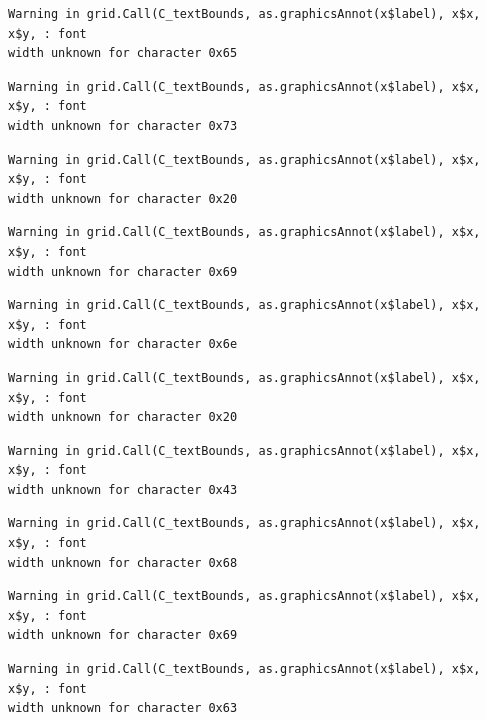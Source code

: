 \documentclass[
  letterpaper,
  DIV=11,
  numbers=noendperiod]{scrreprt}
\begin{document}
\begin{verbatim}
Warning in grid.Call(C_textBounds, as.graphicsAnnot(x$label), x$x, x$y, : font
width unknown for character 0x65
\end{verbatim}

\begin{verbatim}
Warning in grid.Call(C_textBounds, as.graphicsAnnot(x$label), x$x, x$y, : font
width unknown for character 0x73
\end{verbatim}

\begin{verbatim}
Warning in grid.Call(C_textBounds, as.graphicsAnnot(x$label), x$x, x$y, : font
width unknown for character 0x20
\end{verbatim}

\begin{verbatim}
Warning in grid.Call(C_textBounds, as.graphicsAnnot(x$label), x$x, x$y, : font
width unknown for character 0x69
\end{verbatim}

\begin{verbatim}
Warning in grid.Call(C_textBounds, as.graphicsAnnot(x$label), x$x, x$y, : font
width unknown for character 0x6e
\end{verbatim}

\begin{verbatim}
Warning in grid.Call(C_textBounds, as.graphicsAnnot(x$label), x$x, x$y, : font
width unknown for character 0x20
\end{verbatim}

\begin{verbatim}
Warning in grid.Call(C_textBounds, as.graphicsAnnot(x$label), x$x, x$y, : font
width unknown for character 0x43
\end{verbatim}

\begin{verbatim}
Warning in grid.Call(C_textBounds, as.graphicsAnnot(x$label), x$x, x$y, : font
width unknown for character 0x68
\end{verbatim}

\begin{verbatim}
Warning in grid.Call(C_textBounds, as.graphicsAnnot(x$label), x$x, x$y, : font
width unknown for character 0x69
\end{verbatim}

\begin{verbatim}
Warning in grid.Call(C_textBounds, as.graphicsAnnot(x$label), x$x, x$y, : font
width unknown for character 0x63
\end{verbatim}
\end{document}
